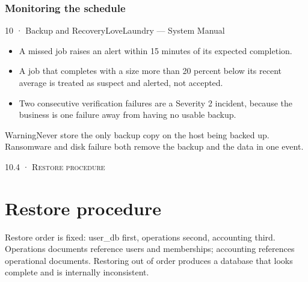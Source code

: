 \documentclass[11pt,a4paper,oneside]{book}
\begin{document}
\subsubsection*{Monitoring the schedule}
10 · Backup and RecoveryLoveLaundry — System Manual

\begin{itemize}
\item A missed job raises an alert within 15 minutes of its expected completion.
\item A job that completes with a size more than 20 percent below its recent average is treated as suspect and alerted, not accepted.
\item Two consecutive verification failures are a Severity 2 incident, because the business is one failure away from having no usable backup.
\end{itemize}
\begin{notebox}WarningNever store the only backup copy on the host being backed up. Ransomware and disk failure both remove the backup and the data in one event.\end{notebox}
\textsc{\small\color{crimson}10.4 · Restore procedure}\par\medskip
\section*{Restore procedure}
Restore order is fixed: user\_db first, operations second, accounting third. Operations documents reference users and memberships; accounting references operational documents. Restoring out of order produces a database that looks complete and is internally inconsistent.
\end{document}
